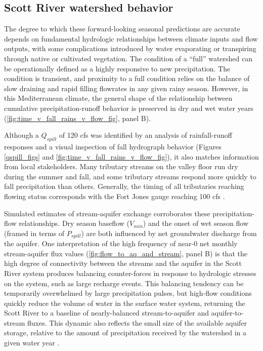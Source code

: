 \documentclass[hess, manuscript]{copernicus}
\begin{document}
\subsection{Scott River watershed behavior}

The degree to which these forward-looking seasonal predictions are
accurate depends on fundamental hydrologic relationships between climate
inputs and flow outputs, with some complications introduced by water
evaporating or transpiring through native or cultivated vegetation. The
condition of a ``full'' watershed can be operationally defined as a
highly responsive to new precipitation. The condition is transient, and
proximity to a full condition relies on the balance of slow draining and
rapid filling flowrates in any given rainy season. However, in this
Mediterranean climate, the general shape of the relationship between
cumulative precipitation-runoff behavior is preserved in dry and wet
water years (\autoref{fig:time_v_fall_rains_v_flow_fig}, panel B).

Although a \(Q_{spill}\) of 120 cfs was identified by an analysis of
rainfall-runoff responses and a visual inspection of fall hydrograph
behavior (Figures \ref{qspill_figs} and
\ref{fig:time_v_fall_rains_v_flow_fig}), it also matches information
from local stakeholders. Many tributary streams on the valley floor run
dry during the summer and fall, and some tributary streams respond more
quickly to fall precipitation than others. Generally, the timing of all
tributaries reaching flowing status corresponds with the Fort Jones
gauge reaching 100 cfs \citep{Sommarstrom2020}.

Simulated estimates of stream-aquifer exchange corroborates these
precipitation-flow relationships. Dry season baseflow (\(V_{min}\)) and
the onset of wet season flow (framed in terms of \(P_{spill}\)) are both
influenced by net groundwater discharge from the aquifer. One
interpretation of the high frequency of near-0 net monthly
stream-aquifer flux values (\autoref{fig:flow_to_aq_and_stream}, panel
B) is that the high degree of connectivity between the streams and the
aquifer in the Scott River system produces balancing counter-forces in
response to hydrologic stresses on the system, such as large recharge
events. This balancing tendency can be temporarily overwhelmed by large
precipitation pulses, but high-flow conditions quickly reduce the volume
of water in the surface water system, returning the Scott River to a
baseline of nearly-balanced stream-to-aquifer and aquifer-to-stream
fluxes. This dynamic also reflects the small size of the available
aquifer storage, relative to the amount of precipitation received by the
watershed in a given water year \citeyearpar[DWR][]{DWR2004}.
\end{document}
